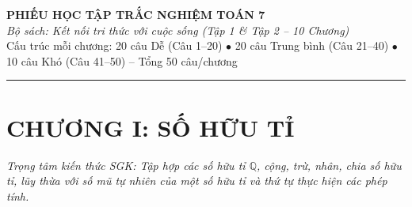 \documentclass[11pt,a4paper]{article}
\begin{document}
\begin{center}
  {\LARGE\bfseries\color{primary} PHIẾU HỌC TẬP TRẮC NGHIỆM TOÁN 7}\\[4pt]
  {\normalsize\itshape\color{accent} Bộ sách: Kết nối tri thức với cuộc sống (Tập 1 \& Tập 2 – 10 Chương)}\\[4pt]
  {\small Cấu trúc mỗi chương: 20 câu Dễ (Câu 1--20) $\bullet$ 20 câu Trung bình (Câu 21--40) $\bullet$ 10 câu Khó (Câu 41--50) -- Tổng 50 câu/chương}
\end{center}
\vspace{6pt}\hrule\vspace{10pt}
\section*{\color{primary} CHƯƠNG I: SỐ HỮU TỈ}
\textit{Trọng tâm kiến thức SGK: Tập hợp các số hữu tỉ $\mathbb{Q}$, cộng, trừ, nhân, chia số hữu tỉ, lũy thừa với số mũ tự nhiên của một số hữu tỉ và thứ tự thực hiện các phép tính.}\par\vspace{4pt}
\end{document}
